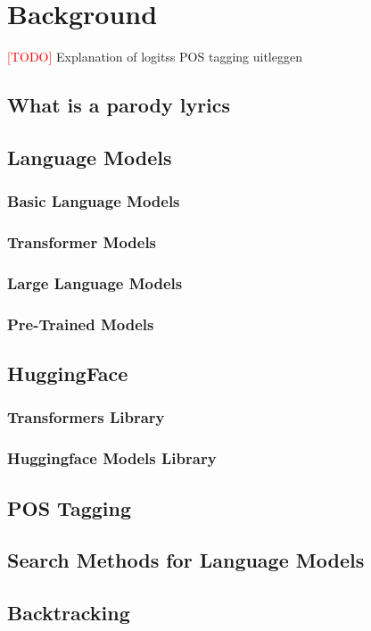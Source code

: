 \chapter{Background}
\label{cha:2}
\textcolor{red}{[TODO]}
Explanation of logitss 
POS tagging uitleggen

\section{What is a parody lyrics}

\section{Language Models}

\subsection{Basic Language Models}

\subsection{Transformer Models}

\subsection{Large Language Models}

\subsection{Pre-Trained Models}

\section{HuggingFace}
\subsection{Transformers Library}
\subsection{Huggingface Models Library}

\section{POS Tagging}

\section{Search Methods for Language Models}

\section{Backtracking}

